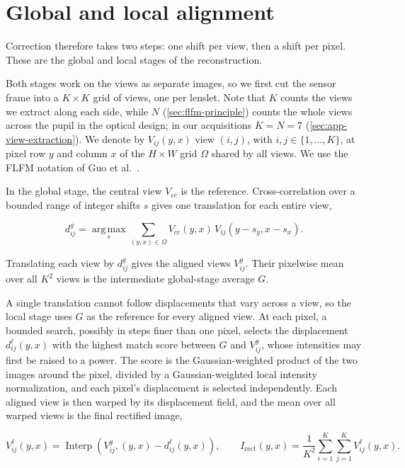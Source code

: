 \section{Global and local alignment}
\label{sec:global-local-alignment}

Correction therefore takes two steps: one shift per view, then a shift per pixel. These are the global and local stages of the reconstruction.

Both stages work on the views as separate images, so we first cut the sensor frame into a $K\times K$ grid of views, one per lenslet. Note that $K$ counts the views we extract along each side, while $N$ (\cref{sec:flfm-principle}) counts the whole views across the pupil in the optical design; in our acquisitions $K=N=7$ (\cref{sec:app-view-extraction}). We denote by $V_{ij}(y,x)$ view $(i,j)$, with $i,j\in\{1,\ldots,K\}$, at pixel row $y$ and column $x$ of the $H\times W$ grid $\Omega$ shared by all views. We use the FLFM notation of Guo et al.~\cite{guo2019fourierLightField}.

In the global stage, the central view $V_{cc}$ is the reference. Cross-correlation over a bounded range of integer shifts $s$ gives one translation for each entire view,

\begin{equation}
    d^g_{ij}=\operatorname*{arg\,max}_{s}\sum_{(y,x)\in\Omega}V_{cc}(y,x)\,V_{ij}(y-s_y,x-s_x).
\end{equation}

Translating each view by $d^g_{ij}$ gives the aligned views $V^g_{ij}$. Their pixelwise mean over all $K^2$ views is the intermediate global-stage average $G$.

A single translation cannot follow displacements that vary across a view, so the local stage uses $G$ as the reference for every aligned view. At each pixel, a bounded search, possibly in steps finer than one pixel, selects the displacement $d^\ell_{ij}(y,x)$ with the highest match score between $G$ and $V^g_{ij}$, whose intensities may first be raised to a power. The score is the Gaussian-weighted product of the two images around the pixel, divided by a Gaussian-weighted local intensity normalization, and each pixel's displacement is selected independently. Each aligned view is then warped by its displacement field, and the mean over all warped views is the final rectified image,

\begin{equation}
    V^\ell_{ij}(y,x)=\operatorname{Interp}\!\left(V^g_{ij},(y,x)-d^\ell_{ij}(y,x)\right),
    \qquad I_{\mathrm{rect}}(y,x)=\frac{1}{K^2}\sum_{i=1}^{K}\sum_{j=1}^{K}V^\ell_{ij}(y,x).
\end{equation}

